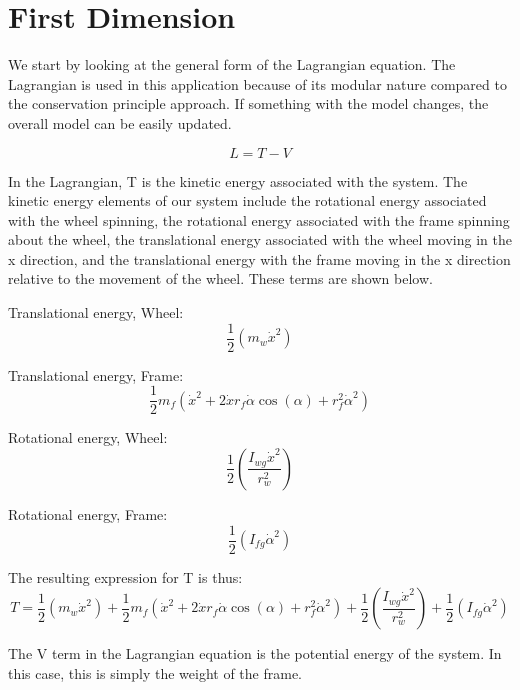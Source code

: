 \documentclass{article}
\begin{document}
\section{First Dimension}
We start by looking at the general form of the Lagrangian equation.  The Lagrangian is used in this application because of its modular nature compared to the conservation principle approach.  If something with the model changes, the overall model can be easily updated.

\begin{equation}
 L = T - V 
 \end{equation}
 
 In the Lagrangian, T is the kinetic energy associated with the system. The kinetic energy elements of our system include the rotational energy associated with the wheel spinning, the rotational energy associated with the frame spinning about the wheel, the translational energy associated with the wheel moving in the x direction, and the translational energy with the frame moving in the x direction relative to the movement of the wheel.  These terms are shown below.
 
 Translational energy, Wheel:
 \begin{equation}
  \frac{1}{2} (m_{w} \dot{x}^2)
\end{equation}  

Translational energy, Frame:
\begin{equation}
\frac{1}{2} m_{f} (\dot{x}^2 + 2 \dot{x} r_{f} \dot{\alpha} \cos(\alpha)   + r_{f}^2 \dot{\alpha}^2)
\end{equation}

Rotational energy, Wheel:
\begin{equation}
\frac{1}{2} \left(   \frac{I_{wg} \dot{x}^2}     {r_{w}^2  } \right)
\end{equation}

Rotational energy, Frame:
\begin{equation}
\frac{1}{2} (I_{fg} \dot{\alpha}^2 )
\end{equation}

The resulting expression for T is thus:
\begin{equation}
T = \frac{1}{2} (m_{w} \dot{x}^2) + \frac{1}{2} m_{f} (\dot{x}^2 + 2 \dot{x} r_{f} \dot{\alpha} \cos(\alpha)   + r_{f}^2 \dot{\alpha}^2)  + \frac{1}{2} \left(   \frac{I_{wg} \dot{x}^2}     {r_{w}^2  } \right) + \frac{1}{2} (I_{fg} \dot{\alpha}^2 )
\end{equation}

The V term in the Lagrangian equation is the potential energy of the system.  In this case, this is simply the weight of the frame.
\end{document}

